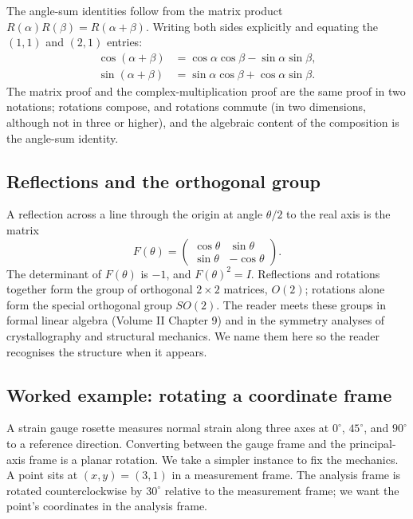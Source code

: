 The angle-sum identities follow from the matrix product
$R(\alpha) R(\beta) = R(\alpha + \beta)$. Writing both sides
explicitly and equating the $(1, 1)$ and $(2, 1)$ entries:
\begin{align*}
\cos(\alpha + \beta) &= \cos\alpha\cos\beta - \sin\alpha\sin\beta, \\
\sin(\alpha + \beta) &= \sin\alpha\cos\beta + \cos\alpha\sin\beta.
\end{align*}
The matrix proof and the complex-multiplication proof are the
same proof in two notations; rotations compose, and rotations
commute (in two dimensions, although not in three or higher), and
the algebraic content of the composition is the angle-sum
identity.

\subsection{Reflections and the orthogonal group}

A reflection across a line through the origin at angle $\theta/2$
to the real axis is the matrix
\[
F(\theta) = \begin{pmatrix} \cos\theta & \sin\theta \\ \sin\theta & -\cos\theta \end{pmatrix}.
\]
The determinant of $F(\theta)$ is $-1$, and $F(\theta)^{2} = I$.
Reflections and rotations together form the group of orthogonal
$2\times 2$ matrices, $O(2)$; rotations alone form the special
orthogonal group $SO(2)$. The reader meets these groups in formal
linear algebra (Volume II Chapter 9) and in the symmetry analyses
of crystallography and structural mechanics. We name them here so
the reader recognises the structure when it appears.

\subsection{Worked example: rotating a coordinate frame}

A strain gauge rosette measures normal strain along three axes at
$0^{\circ}$, $45^{\circ}$, and $90^{\circ}$ to a reference
direction. Converting between the gauge frame and the principal-axis
frame is a planar rotation. We take a simpler instance to fix the
mechanics. A point sits at $(x, y) = (3, 1)$ in a measurement frame.
The analysis frame is rotated counterclockwise by $30^{\circ}$
relative to the measurement frame; we want the point's coordinates
in the analysis frame.

